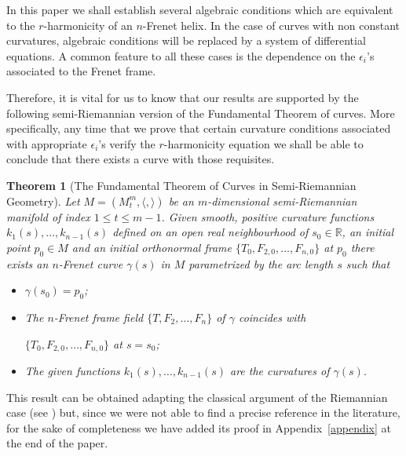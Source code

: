 \documentclass[11pt]{amsart}
\theoremstyle{plain}
\newtheorem{theorem}                {Theorem}      [section]
\theoremstyle{definition}
\numberwithin{equation}{section}
\def \R{{\mathbb R}}
\begin{document}
In this paper we shall establish several algebraic conditions which are equivalent to the $r$-harmonicity of an $n$-Frenet helix. In the case of curves with non constant curvatures, algebraic conditions will be replaced by a system of differential equations. A common feature to all these cases is the dependence on the $\epsilon_i$'s associated to the Frenet frame. 

Therefore, it is vital for us to know that our results are supported by the following semi-Riemannian version of the Fundamental Theorem of curves. More specifically, any time that we prove that certain curvature conditions associated with appropriate $\epsilon_i$'s verify the $r$-harmonicity equation we shall be able to conclude that there exists a curve with those requisites.

\begin{theorem}[The Fundamental Theorem of Curves in Semi-Riemannian Geometry]\label{Th-Fund-curves}
Let $M=(M^m_t,\langle, \rangle)$ be an $m$-dimensional semi-Riemannian manifold of index $1 \leq t \leq m-1$. Given smooth, positive curvature functions $k_1(s),\ldots,k_{n-1}(s)$ defined on an open real neighbourhood of $s_0\in \R$, an initial point $p_0\in M$ and an initial orthonormal frame $\{T_0,F_{2,0},\ldots,F_{n,0}\}$ at $p_0$ there exists an $n$-Frenet curve $\gamma(s)$ in $M$ parametrized by the arc length $s$ such that
\begin{itemize}
\item [(i)] $\gamma(s_0)=p_0$;
\item [(ii)] The $n$-Frenet frame field $\{T,F_{2},\ldots,F_{n}\}$ of $\gamma$ coincides with 

\noindent $\{T_0,F_{2,0},\ldots,F_{n,0}\}$ at $s=s_0$;
\item [(iii)] The given functions $k_1(s),\ldots,k_{n-1}(s)$ are the curvatures of $\gamma(s)$.
\end{itemize}
\end{theorem}
This result can be obtained adapting the classical argument of the Riemannian case (see \cite{Spivak}) but, since we were not able to find a precise reference in the literature, for the sake of completeness we have added its proof in Appendix~\ref{appendix} at the end of the paper.
\end{document}
